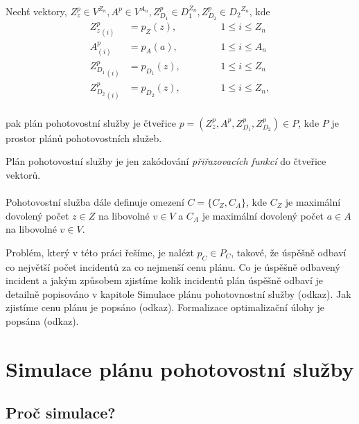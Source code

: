 \clearpage

\begin{definice}
  Nechť vektory, $Z^{p}_z \in V^{Z_n}, A^{p} \in V^{A_n}, Z^{p}_{D_1} \in D_{1}^{Z_n}, Z^{p}_{D_2} \in {D_2}^{Z_n}$, kde
  \begin{align}
    {Z^{p}_z}_{(i)} &= p_Z(z), \hspace{40pt} &1 \leq i \leq Z_n \\
    A^{p}_{(i)} &= p_A(a), \hspace{40pt} &1 \leq i \leq A_n \\
    {Z^{p}_{D_1}}_{(i)} &= p_{D_1}(z), \hspace{40pt} &1 \leq i \leq Z_n \\
    {Z^{p}_{D_2}}_{(i)} &= p_{D_2}(z), \hspace{40pt} &1 \leq i \leq Z_n,
  \end{align}
  \\
  pak plán pohotovostní služby je čtveřice $p = (Z^{p}_z, A^{p}, Z^{p}_{D_1}, Z^{p}_{D_2}) \in P$, kde $P$ je prostor plánů pohotovostních služeb.
  \\
\end{definice}

Plán pohotovostní služby je jen zakódování \textit{přiřazovacích funkcí} %
do čtveřice vektorů.
\\
\\
Pohotovostní služba dále definuje omezení $C = \{ C_Z, C_A \}$, kde $C_Z$ je maximální dovolený počet $z \in Z$ na libovolné $v \in V$
a $C_A$ je maximální dovolený počet $a \in A$ na libovolné $v \in V$.



Problém, který v této práci řešíme, je nalézt $p_C \in P_C$, takové, že úspěšně odbaví co největší počet incidentů za co nejmenší cenu plánu.
Co je úspěšně odbavený incident a jakým způsobem zjistíme kolik incidentů plán úspěšně odbaví je detailně popisováno v kapitole Simulace plánu pohotovnostní služby (odkaz).
Jak zjistíme cenu plánu je popsáno (odkaz).
Formalizace optimalizační úlohy je popsána (odkaz).

\section{Simulace plánu pohotovostní služby}

\subsection{Proč simulace?}

